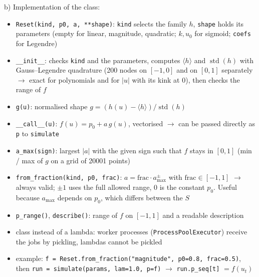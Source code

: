 b) Implementation of the class:
\begin{itemize}
    \item \texttt{Reset(kind, p0, a, **shape)}: \texttt{kind} selects the family $h$, \texttt{shape} holds its
    parameters (empty for linear, magnitude, quadratic; $k, u_0$ for sigmoid; \texttt{coefs} for Legendre)
    \item \texttt{\_\_init\_\_}: checks \texttt{kind} and the parameters, computes $\langle h \rangle$ and
    $\operatorname{std}(h)$ with Gauss--Legendre quadrature (200 nodes on $[-1, 0]$ and on $[0, 1]$ separately $\to$
    exact for polynomials and for $\lvert u \rvert$ with its kink at 0), then checks the range of $f$
    \item \texttt{g(u)}: normalised shape $g = (h(u) - \langle h \rangle) / \operatorname{std}(h)$
    \item \texttt{\_\_call\_\_(u)}: $f(u) = p_0 + a\, g(u)$, vectorised $\to$ can be passed directly as \texttt{p} to
    \texttt{simulate}
    \item \texttt{a\_max(sign)}: largest $\lvert a \rvert$ with the given sign such that $f$ stays in $[0, 1]$
    (min / max of $g$ on a grid of 20001 points)
    \item \texttt{from\_fraction(kind, p0, frac)}: $a = \text{frac} \cdot a_{\max}^{\pm}$ with
    $\text{frac} \in [-1, 1]$ $\to$ always valid; $\pm 1$ uses the full allowed range, $0$ is the constant $p_0$.
    Useful because $a_{\max}$ depends on $p_0$, which differs between the $S$
    \item \texttt{p\_range()}, \texttt{describe()}: range of $f$ on $[-1, 1]$ and a readable description
    \item class instead of a lambda: worker processes (\texttt{ProcessPoolExecutor}) receive the jobs by pickling,
    lambdas cannot be pickled
    \item example: \texttt{f = Reset.from\_fraction("magnitude", p0=0.8, frac=0.5)}, then
    \texttt{run = simulate(params, lam=1.0, p=f)} $\to$ \texttt{run.p\_seq[t]} $= f(u_t)$
\end{itemize}


